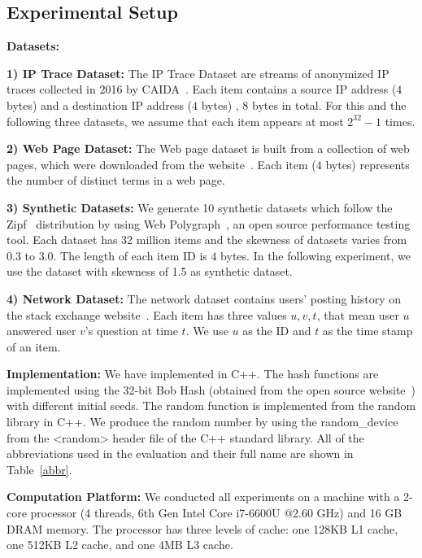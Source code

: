 \presub
\subsection{Experimental Setup} \postsub
\label{subsec:setup}
%
\noindent\textbf{Datasets:}

\noindent\textbf{1) IP Trace Dataset:}
The IP Trace Dataset are streams of anonymized IP traces collected in 2016 by CAIDA~\cite{caida}. Each item contains a source IP address ($4$ bytes) and a destination IP address ($4$ bytes){\color{reviewA} , 8 bytes in total.} {\color{reviewA} For this and the following three datasets, we assume that each item appears at most $2^{32}-1$ times.}

\noindent\textbf{2) Web Page Dataset:}
The Web page dataset is built from a collection of web pages, which were downloaded from the website~\cite{webdocs}.
Each item ($4$ bytes) represents the number of distinct terms in a web page.

\noindent\textbf{3) Synthetic Datasets:}
We generate 10 synthetic datasets which follow the Zipf~\cite{zipf} distribution by using Web Polygraph~\cite{webpoly}, an open source performance testing tool. Each dataset has 32 million items and the skewness of datasets varies from 0.3 to 3.0. The length of each item ID is $4$ bytes. 
In the following experiment, we use the dataset with skewness of 1.5 as synthetic dataset.

\noindent\textbf{4) Network Dataset:}
The network dataset contains users' posting history on the stack exchange website~\cite{net_dat}. Each item has three values $u,v,t$, that mean user $u$ answered user $v$'s question at time $t$. We use $u$ as the ID and $t$ as the time stamp of an item.

\noindent\textbf{Implementation:}
We have implemented \sketchname {} in C++.
The hash functions are implemented using the 32-bit Bob Hash (obtained from the open source website~\cite{bobhash}) with different initial seeds. The random function is implemented from the random library in C++. We produce the random number by using the random\_device from the <random> header file of the C++ standard library. All of the abbreviations used in the evaluation and their full name are shown in Table~\ref{abbr}.

\noindent\textbf{Computation Platform:}
We conducted all experiments on a machine with a 2-core processor (4 threads, 6th Gen Intel Core i7-6600U @2.60 GHz)
and 16 GB DRAM memory.
The processor has three levels of cache: one 128KB L1 cache, one 512KB L2 cache, and one 4MB L3 cache. 


